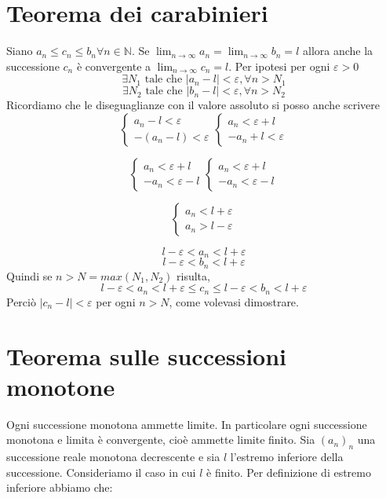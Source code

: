 \documentclass{article}
\begin{document}
\section{Teorema dei carabinieri}
Siano $a_n \leq c_n \leq b_n \forall n \in \mathbb{N}$. Se $\lim_{n \to \infty} a_n = \lim_{n \to \infty} b_n = l$ allora anche la successione $c_n$ è convergente a $\lim_{n \to \infty} c_n = l$.
Per ipotesi per ogni $\varepsilon>0$
$$\exists N_1 \text{ tale che } |a_n - l| < \varepsilon, \forall n > N_1$$
$$\exists N_2 \text{ tale che } |b_n - l| < \varepsilon, \forall n > N_2$$
Ricordiamo che le diseguaglianze con il valore assoluto si posso anche scrivere
\begin{equation}
    \begin{cases}
        a_n - l < \varepsilon \\
        -(a_n - l) < \varepsilon
    \end{cases}
    \begin{cases}
        a_n < \varepsilon + l \\
        -a_n + l < \varepsilon
    \end{cases}
\end{equation}

\begin{equation}
    \begin{cases}
        a_n < \varepsilon + l \\
        -a_n < \varepsilon - l
    \end{cases}
    \begin{cases}
        a_n < \varepsilon + l \\
        -a_n < \varepsilon - l
    \end{cases}
\end{equation}

\begin{equation}
    \begin{cases}
        a_n < l + \varepsilon \\
        a_n > l - \varepsilon
    \end{cases}
\end{equation}

$$l-\varepsilon < a_n < l + \varepsilon$$
$$l-\varepsilon < b_n < l + \varepsilon$$
Quindi se $n>N = max(N_1,N_2)$ risulta, $$l-\varepsilon < a_n < l + \varepsilon \leq c_n\leq l-\varepsilon < b_n < l + \varepsilon$$
Perciò $|c_n - l|<\varepsilon$ per ogni $n>N$, come volevasi dimostrare.

\section{Teorema sulle successioni monotone}
Ogni successione monotona ammette limite. In particolare ogni successione monotona e limita è convergente, cioè ammette limite finito.
Sia $(a_n)_n$ una successione reale monotona decrescente e sia $l$ l'estremo inferiore della successione. Consideriamo il caso in cui $l$ è finito. Per definizione di estremo inferiore abbiamo che:
\end{document}
